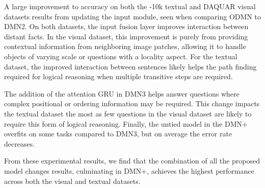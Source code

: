 \documentclass{article}
\begin{document}
A large improvement to accuracy on both the \babi-10k textual and DAQUAR visual datasets results from updating the input module, seen when comparing ODMN to DMN2.
On both datasets, the input fusion layer improves interaction between distant facts.
In the visual dataset, this improvement is purely from providing contextual information from neighboring image patches, allowing it to handle objects of varying scale or questions with a locality aspect.
For the textual dataset, the improved interaction between sentences likely helps the path finding required for logical reasoning when multiple transitive steps are required.

The addition of the attention GRU in DMN3 helps answer questions where complex positional or ordering information may be required.
This change impacts the textual dataset the most as few questions in the visual dataset are likely to require this form of logical reasoning.
Finally, the untied model in the DMN+ overfits on some tasks compared to DMN3, but on average the error rate decreases.

From these experimental results, we find that the combination of all the proposed model changes results, culminating in DMN+, achieves the highest performance across both the visual and textual datasets.
\end{document}
